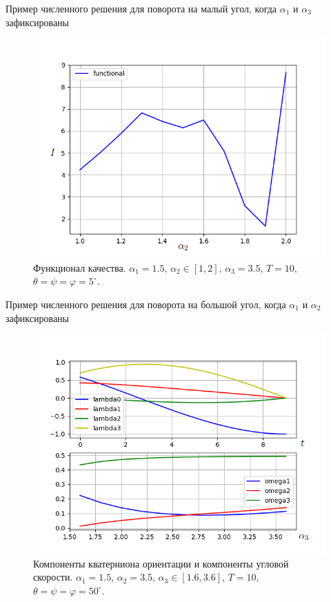 \documentclass[10pt,utf8,presentation,notheorems,xcolor=dvipsnames,compress]{beamer}
\renewcommand{\phi}{\varphi} %
\begin{document}
\begin{frame}{Пример численного решения для поворота на малый угол, когда $\alpha_1$ и $\alpha_3$ зафиксированы}
\begin{figure}[H]
\center\includegraphics[scale=0.5]{fig/functional_alpha2_1-2_5.png}
\caption{Функционал качества. $\alpha_1 = 1.5$, $\alpha_2 \in [1, 2]$, $\alpha_3 = 3.5$, $\textit{T} = 10$, $\theta = \psi = \phi = 5^{\circ}$.}
\end{figure}
\end{frame}

\begin{frame}{Пример численного решения для поворота на большой угол, когда $\alpha_1$ и $\alpha_2$ зафиксированы}
\begin{figure}[H]
\center\includegraphics[scale=0.5]{fig/ivp_and_control_50_alpha3_1_6-3_6_alpha1-1_5_alpha2-3_5.png}
\caption{Компоненты кватерниона ориентации и компоненты угловой скорости. $\alpha_1 = 1.5$, $\alpha_2 = 3.5$, $\alpha_3 \in [1.6, 3.6]$, $\textit{T} = 10$, $\theta = \psi = \phi = 50^{\circ}$.}
\end{figure}
\end{frame}
\end{document}
